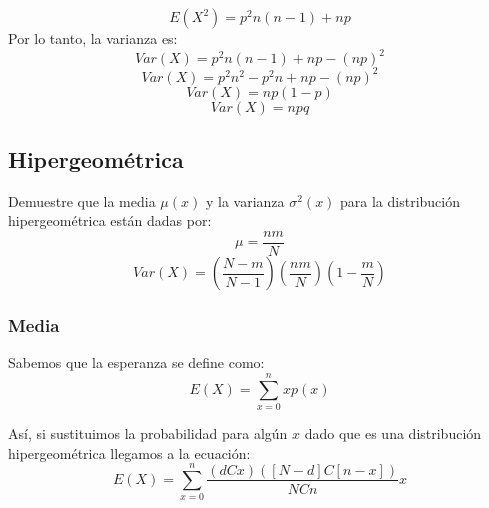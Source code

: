 \documentclass[12pt]{article}
\begin{document}
              \begin{equation*}
              E({ X }^{ 2 })={ p }^{ 2 }n(n-1)+np
              \end{equation*}
              \newpage Por lo tanto, la varianza es:
              \begin{equation*}
              Var(X)={ p }^{ 2 }n(n-1)+np-{ (np) }^{ 2 }
              \end{equation*}
              \begin{equation*}
              Var(X)={ p }^{ 2 }{ n }^{ 2 }-{ p }^{ 2 }n+np-{ (np) }^{ 2 }
              \end{equation*}
              \begin{equation*}
              Var(X)=np(1-p)
              \end{equation*}
              \begin{equation*}
              Var(X)=npq
              \end{equation*}
          
		\subsection{Hipergeométrica}
       		Demuestre que la media $\mu (x)$ y la varianza $\sigma^2 (x)$ para la distribución hipergeométrica están dadas por:
            \begin{equation}
            	\mu = \frac{nm}{N}
            \end{equation}
            \begin{equation}
				Var(X)=\left( \frac{N-m}{N-1} \right)\left( \frac{nm}{N} \right)\left( 1-\frac{m}{N} \right)
            \end{equation}
            
            \subsubsection{Media}
             Sabemos que la esperanza se define como:
          \begin{equation*}
           E(X)=\sum _{ x=0 }^{ n }{ xp(x) }
          \end{equation*} 

           Así, si sustituimos la probabilidad para algún $x$ dado que es una distribución hipergeométrica llegamos a la ecuación:
           \begin{equation*}
           E(X)=\sum _{ x=0 }^{ n }{ \frac { (dCx)\left( \left[ N-d \right] C\left[ n-x \right]  \right)  }{ NCn } x } 
           \end{equation*}
\end{document}
